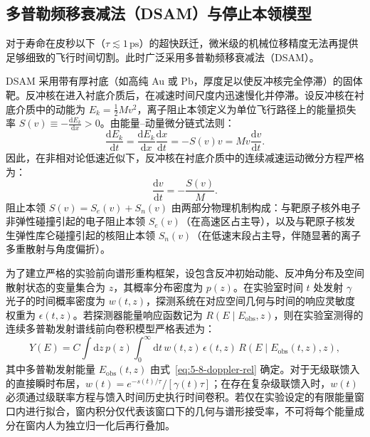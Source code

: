 \subsection{多普勒频移衰减法（DSAM）与停止本领模型}\label{subsec:5-8-3}

对于寿命在皮秒以下（$\tau \lesssim 1\,\text{ps}$）的超快跃迁，微米级的机械位移精度无法再提供足够细致的飞行时间切割。此时广泛采用多普勒频移衰减法（DSAM）。

DSAM 采用带有厚衬底（如高纯 Au 或 Pb，厚度足以使反冲核完全停滞）的固体靶。反冲核在进入衬底介质后，在减速时间尺度内迅速慢化并停滞。设反冲核在衬底介质中的动能为 $E_k = \frac{1}{2} M v^2$，离子阻止本领定义为单位飞行路径上的能量损失率 $S(v) \equiv -\frac{\mathrm{d}E_k}{\mathrm{d}x} > 0$。由能量--动量微分链式法则：
\begin{equation}\label{eq:5-8-stopping-chain-rule}
\frac{\mathrm{d}E_k}{\mathrm{d}t} = \frac{\mathrm{d}E_k}{\mathrm{d}x} \frac{\mathrm{d}x}{\mathrm{d}t} = -S(v) v = M v \frac{\mathrm{d}v}{\mathrm{d}t}.
\end{equation}
因此，在非相对论低速近似下，反冲核在衬底介质中的连续减速运动微分方程严格为：
\begin{equation}\label{eq:5-8-velocity-history}
\frac{\mathrm{d}v}{\mathrm{d}t} = -\frac{S(v)}{M}.
\end{equation}
阻止本领 $S(v) = S_e(v) + S_n(v)$ 由两部分物理机制构成：与靶原子核外电子非弹性碰撞引起的电子阻止本领 $S_e(v)$（在高速区占主导），以及与靶原子核发生弹性库仑碰撞引起的核阻止本领 $S_n(v)$（在低速末段占主导，伴随显著的离子多重散射与角度偏折）。

为了建立严格的实验前向谱形重构框架，设包含反冲初始动能、反冲角分布及空间散射状态的变量集合为 $z$，其概率分布密度为 $p(z)$。在实验室时间 $t$ 处发射 $\gamma$ 光子的时间概率密度为 $w(t, z)$，探测系统在对应空间几何与时间的响应灵敏度权重为 $\epsilon(t, z)$。若探测器能量响应函数记为 $R(E \mid E_{\mathrm{obs}}, z)$，则在实验室测得的连续多普勒发射谱线前向卷积模型严格表述为：
\begin{equation}\label{eq:5-8-forward-lineshape-model}
Y(E) = C \int \mathrm{d}z \, p(z) \int_0^\infty \mathrm{d}t \, w(t, z) \, \epsilon(t, z) \, R\left(E \mid E_{\mathrm{obs}}(t, z), z\right),
\end{equation}
其中多普勒发射能量 $E_{\mathrm{obs}}(t, z)$ 由式~\eqref{eq:5-8-doppler-rel} 确定。对于无级联馈入的直接瞬时布居，$w(t) = e^{-s(t)/\tau} / [\gamma(t) \tau]$；在存在复杂级联馈入时，$w(t)$ 必须通过级联率方程与馈入时间历史执行时间卷积。若仅在实验设定的有限能量窗口内进行拟合，窗内积分仅代表该窗口下的几何与谱形接受率，不可将每个能量成分在窗内人为独立归一化后再行叠加。

